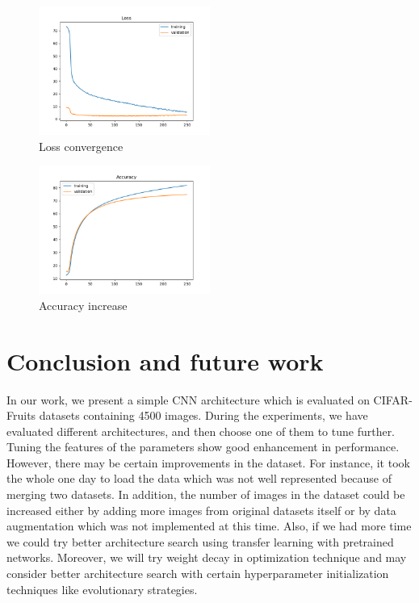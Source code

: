 \documentclass{IEEEtran}
\begin{document}
\begin{figure}[h]
	\centering
	\includegraphics[width=0.5\textwidth]{Loss}
	\caption{Loss convergence}
	\label{fig:loss}
\end{figure}

\begin{figure}[h]
	\centering
	\includegraphics[width=0.5\textwidth]{Accuracy}
	\caption{Accuracy increase}
	\label{fig:accuracy}
\end{figure}

\section{Conclusion and future work}

In our work, we present a simple CNN architecture which is evaluated on CIFAR-Fruits datasets containing 4500 images. During the experiments, we have evaluated different architectures, and then choose one of them to tune further. Tuning the features of the parameters show good enhancement in performance. However, there may be certain improvements in the dataset. For instance, it took the whole one day to load the data which was not well represented because of merging two datasets. In addition, the number of images in the dataset could be increased either by adding more images from original datasets itself or by data augmentation which was not implemented at this time. Also, if we had more time we could try better architecture search using transfer learning with pretrained networks. Moreover, we will try weight decay in optimization technique and may consider better architecture search with certain hyperparameter initialization techniques like evolutionary strategies.



\printbibliography
\end{document}
